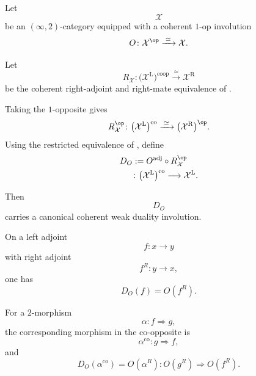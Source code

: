 \begin{theorem}
\label{thm:abstract-mate-reversal-duality}
Let
\[
    \mathcal X
\]
be an $(\infty,2)$-category equipped with a coherent $1$-op involution
\[
    O
    \colon
    \mathcal X^{\op}
    \xrightarrow{\;\simeq\;}
    \mathcal X.
\]

Let
\[
    R_{\mathcal X}
    \colon
    \bigl(
        \mathcal X^{\mathrm L}
    \bigr)^{\mathrm{coop}}
    \xrightarrow{\;\simeq\;}
    \mathcal X^{\mathrm R}
\]
be the coherent right-adjoint and right-mate equivalence of
.

Taking the $1$-opposite gives
\[
    R_{\mathcal X}^{\op}
    \colon
    \bigl(
        \mathcal X^{\mathrm L}
    \bigr)^{\mathrm{co}}
    \xrightarrow{\;\simeq\;}
    \bigl(
        \mathcal X^{\mathrm R}
    \bigr)^{\op}.
\]
Using the restricted equivalence of
,
define
\[
\begin{aligned}
    D_O
    &:=
    O^{\mathrm{adj}}
    \circ
    R_{\mathcal X}^{\op}
    \\
    &\colon
    \bigl(
        \mathcal X^{\mathrm L}
    \bigr)^{\mathrm{co}}
    \longrightarrow
    \mathcal X^{\mathrm L}.
\end{aligned}
\]

Then
\[
    D_O
\]
carries a canonical coherent weak duality involution.

On a left adjoint
\[
    f
    \colon
    x
    \longrightarrow
    y
\]
with right adjoint
\[
    f^R
    \colon
    y
    \longrightarrow
    x,
\]
one has
\[
    D_O(f)
    =
    O(f^R).
\]

For a $2$-morphism
\[
    \alpha
    \colon
    f
    \Longrightarrow
    g,
\]
the corresponding morphism in the co-opposite is
\[
    \alpha^{\mathrm{co}}
    \colon
    g
    \Longrightarrow
    f,
\]
and
\[
    D_O(\alpha^{\mathrm{co}})
    =
    O(\alpha^R)
    \colon
    O(g^R)
    \Longrightarrow
    O(f^R).
\]
\end{theorem}

